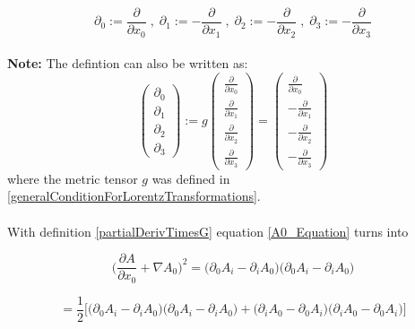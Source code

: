 \documentclass{article}
\begin{document}
\begin{equation} \label{partialDerivTimesG}
\partial_0 := \frac{\partial}{\partial x_0} \;,\;
\partial_1 := -\frac{\partial}{\partial x_1} \;,\;
\partial_2 := -\frac{\partial}{\partial x_2} \;,\;
\partial_3 := -\frac{\partial}{\partial x_3}
\end{equation}
\\
\noindent
\textbf{Note:} The defintion can also be written as:
\begin{equation}
    \left(\begin{array}{c}
              \partial_0
              \\
              \partial_1
              \\
              \partial_2
              \\
              \partial_3
    \end{array} \right)
    := g
    \left(\begin{array}{c}
              \frac{\partial}{\partial x_0}
              \\
              \frac{\partial}{\partial x_1}
              \\
              \frac{\partial}{\partial x_2}
              \\
              \frac{\partial}{\partial x_3}
    \end{array} \right)
    =
    \left(\begin{array}{c}
              \frac{\partial}{\partial x_0}
              \\
              -\frac{\partial}{\partial x_1}
              \\
              -\frac{\partial}{\partial x_2}
              \\
              -\frac{\partial}{\partial x_3}
    \end{array} \right)
\end{equation}
where the metric tensor $g$ was defined in \ref{generalConditionForLorentzTransformations}.
\\
\\
\noindent
With definition \ref{partialDerivTimesG} equation \ref{A0_Equation} turns into

\begin{equation}
\bigg(\frac{\partial A}{\partial x_0} + \nabla A_0 \bigg)^2
= \big(\partial_0 A_i - \partial_i A_0 \big) \big(\partial_0 A_i - \partial_i A_0 \big)
\end{equation}

\begin{equation}
= \frac{1}{2} \bigg[  \big(\partial_0 A_i - \partial_i A_0 \big) \big(\partial_0 A_i - \partial_i A_0 \big)
                    + \big(\partial_i A_0 - \partial_0 A_i \big) \big(\partial_i A_0 - \partial_0 A_i \big)\bigg]
\end{equation}
\end{document}
